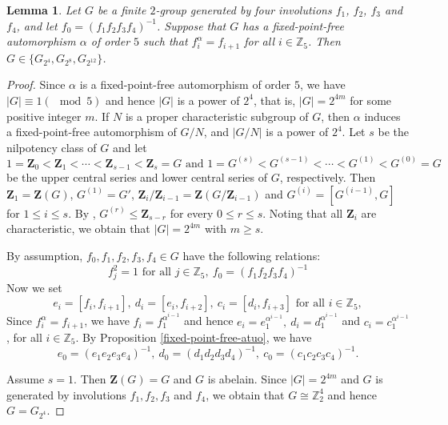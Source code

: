 \documentclass[12pt,reqno]{amsart}
\renewcommand\a{\alpha}  \renewcommand\b{\beta}
\newcommand\Z{\mathbf{Z}} \newcommand\ZZ{\mathbb{Z}}
\newcommand\mz{\mathbb{Z}}
\numberwithin {equation} {section}
\newtheorem{lemma}[theorem]{Lemma}
\begin{document}
\begin{lemma}\label{th:M} Let $G$ be a finite $2$-group generated by four involutions $f_1$, $f_2$, $f_3$ and $f_4$, and let $f_0=(f_1f_2f_3f_4)^{-1}$. Suppose that $G$ has a fixed-point-free automorphism $\a$ of order $5$ such that $f_i^\a=f_{i+1}$ for all $i \in \ZZ_5$.
Then $G \in \{G_{2^4}, G_{2^8},G_{2^{12}}\}$.
 \end{lemma}
\begin{proof} Since $\a$ is a fixed-point-free automorphism of order $5$, we have $|G|\equiv 1(\mod 5)$ and hence $|G|$ is a power of $2^4$, that is, $|G|=2^{4m}$ for some positive integer $m$.
 If $N$ is a proper characteristic subgroup of $G$, then $\a$ induces a fixed-point-free automorphism of $G/N$, and $|G/N|$ is a power of $2^4$. Let $s$ be the  nilpotency class of $G$ and let \[1=\Z_{0}<\Z_1<\cdots<\Z_{s-1}<\Z_s=G \text{ and } 1=G^{(s)}<G^{(s-1)}<\cdots<G^{(1)}<G^{(0)}=G\]
be  the upper central series and lower central series of $G$, respectively. Then $\Z_1=\Z(G)$, $G^{(1)}=G'$, $\Z_i/\Z_{i-1}=\Z(G/\Z_{i-1})$ and $G^{(i)}=[G^{(i-1)},G]$ for $1\leq i\leq s$. By \cite[Section 3, Chapter 2]{DG}, $G^{(r)} \leq \Z_{s-r}$ for every $0 \leq r \leq s$. Noting that all $\Z_i$ are characteristic, we obtain that $|G|=2^{4m}$ with $m\geq s$.

By assumption, $f_0, f_1,f_2,f_3,f_4\in G$ have the following relations:
\begin{equation}\label{eq:f2}
 f_j^2=1 \text{ for all } j \in \ZZ_5, \  f_0=(f_1f_2f_3f_4)^{-1}
\end{equation}
Now we set
\begin{equation}\label{eq:edc}
 e_i=[f_i,f_{i+1}], \ d_i=[e_i,f_{i+2}], \  c_i=[d_i,f_{i+3}] \text{ for all } i \in \ZZ_5,
\end{equation}
Since $f_i^\a=f_{i+1}$, we have $f_i=f_1^{\a^{i-1}}$ and hence $e_i=e_1^{\a^{i-1}},\ d_i=d_1^{\a^{i-1}}$ and $c_i=c_1^{\a^{i-1}}$, for all $i\in\mz_5$.  By Proposition \ref{fixed-point-free-atuo}, we have
\begin{equation}\label{eq:edc0}
 e_0=(e_1e_2e_3e_4)^{-1}, \ d_0=(d_1d_2d_3d_4)^{-1},\ c_0=(c_1c_2c_3c_4)^{-1}.
\end{equation}

Assume $s=1$. Then $\Z(G)=G$ and $G$ is abelain. Since $|G|=2^{4m}$ and $G$ is generated by involutions $f_1,f_2,f_3$ and $f_4$, we obtain that $G\cong \mz_2^4$ and hence $G=G_{2^4}$.


\end{proof}
\end{document}
